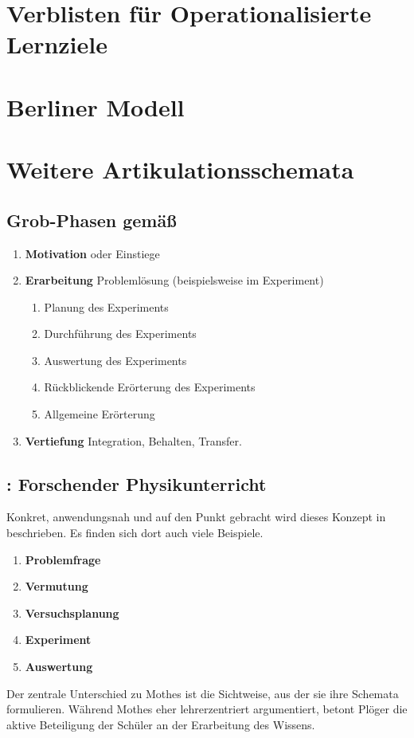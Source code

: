 \appendix
\chapter{Verblisten für Operationalisierte Lernziele}\label{A_Verbliste}


\chapter{Berliner Modell}\label{A_BerlinerModell}

\chapter{Weitere Artikulationsschemata}

\section{Grob-Phasen gem\"{a}{\ss} \textcite{DuitHausslerKircher}}
\begin{enumerate}
	\item {\bf Motivation} oder Einstiege
	\item {\bf Erarbeitung} Probleml\"{o}sung (beispielsweise im Experiment)
	\begin{enumerate}
	\item
	Planung des Experiments
	\item
	Durchf\"{u}hrung des Experiments
	\item
	Auswertung des Experiments
	\item
	R\"{u}ckblickende Er\"{o}rterung des Experiments
	\item
	Allgemeine Er\"{o}rterung
	\end{enumerate}
	\item {\bf Vertiefung} Integration, Behalten, Transfer.
\end{enumerate}

\section{\textcite{Ploeger}: Forschender Physikunterricht}
Konkret, anwendungsnah und auf den Punkt gebracht wird dieses Konzept in
\textcite{Ploeger} beschrieben.
Es finden sich dort auch viele Beispiele.
\begin{enumerate}
	\item {\bf Problemfrage}
	\item {\bf Vermutung}
	\item {\bf Versuchsplanung}
	\item {\bf Experiment}
	\item {\bf Auswertung}
\end{enumerate}
Der zentrale Unterschied zu Mothes ist die Sichtweise, aus der sie ihre Schemata formulieren. Während Mothes eher lehrerzentriert argumentiert, betont Plöger die aktive Beteiligung der Schüler an der Erarbeitung des Wissens.

